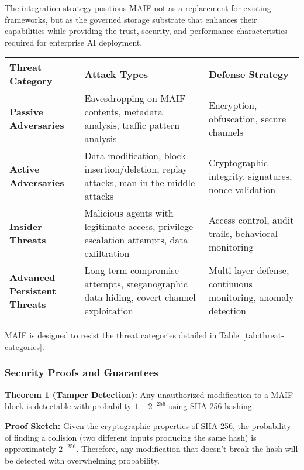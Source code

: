 \documentclass[conference]{IEEEtran}
\begin{document}
The integration strategy positions MAIF not as a replacement for existing frameworks, but as the governed storage substrate that enhances their capabilities while providing the trust, security, and performance characteristics required for enterprise AI deployment.

\begin{table*}[!t]
\renewcommand{\arraystretch}{1.3}
\caption{MAIF Threat Resistance Categories}
\label{tab:threat-categories}
\centering
\footnotesize
\begin{tabular}{p{3cm}p{6cm}p{5cm}}
\toprule
\textbf{Threat Category} & \textbf{Attack Types} & \textbf{Defense Strategy} \\
\midrule
\textbf{Passive Adversaries} & Eavesdropping on MAIF contents, metadata analysis, traffic pattern analysis & Encryption, obfuscation, secure channels \\
\textbf{Active Adversaries} & Data modification, block insertion/deletion, replay attacks, man-in-the-middle attacks & Cryptographic integrity, signatures, nonce validation \\
\textbf{Insider Threats} & Malicious agents with legitimate access, privilege escalation attempts, data exfiltration & Access control, audit trails, behavioral monitoring \\
\textbf{Advanced Persistent Threats} & Long-term compromise attempts, steganographic data hiding, covert channel exploitation & Multi-layer defense, continuous monitoring, anomaly detection \\
\bottomrule
\end{tabular}
\end{table*}

MAIF is designed to resist the threat categories detailed in Table~\ref{tab:threat-categories}.

\subsubsection{Security Proofs and Guarantees}

\textbf{Theorem 1 (Tamper Detection):} Any unauthorized modification to a MAIF block is detectable with probability $1 - 2^{-256}$ using SHA-256 hashing.

\textbf{Proof Sketch:} Given the cryptographic properties of SHA-256, the probability of finding a collision (two different inputs producing the same hash) is approximately $2^{-256}$. Therefore, any modification that doesn't break the hash will be detected with overwhelming probability.
\end{document}
